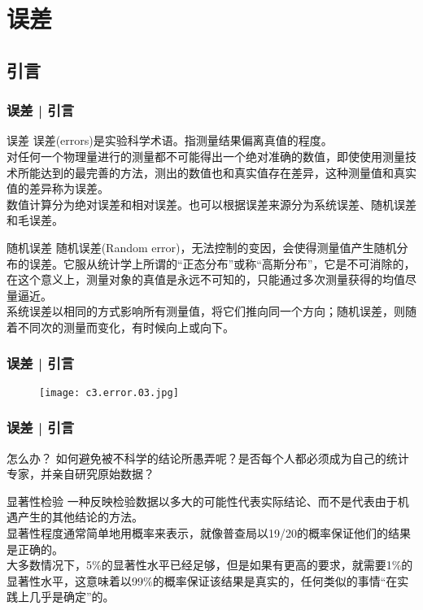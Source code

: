 \section{误差}
\subsection{引言}
\begin{frame}
  \frametitle{误差 | 引言}
  \begin{block}{误差}
    误差(errors)是实验科学术语。指测量结果偏离真值的程度。\\
    \vspace{0.3em}
对任何一个物理量进行的测量都不可能得出一个绝对准确的数值，即使使用测量技术所能达到的最完善的方法，测出的数值也和真实值存在差异，这种测量值和真实值的差异称为误差。\\
\vspace{0.3em}
数值计算分为绝对误差和相对误差。也可以根据误差来源分为系统误差、随机误差和毛误差。
  \end{block}
  \pause
  \begin{block}{随机误差}
    随机误差(Random error)，无法控制的变因，会使得测量值产生随机分布的误差。它服从统计学上所谓的“正态分布”或称“高斯分布”，它是不可消除的，在这个意义上，测量对象的真值是永远不可知的，只能通过多次测量获得的均值尽量逼近。\\
    \vspace{0.3em}
    系统误差以相同的方式影响所有测量值，将它们推向同一个方向；随机误差，则随着不同次的测量而变化，有时候向上或向下。
  \end{block}
\end{frame}

\begin{frame}
  \frametitle{误差 | 引言}
  \begin{figure}
    \centering
    \texttt{[image: c3.error.03.jpg]}
  \end{figure}
\end{frame}

\begin{frame}
  \frametitle{误差 | 引言}
  \begin{block}{怎么办？}
    如何避免被不科学的结论所愚弄呢？是否每个人都必须成为自己的统计专家，并亲自研究原始数据？
  \end{block}
  \pause
  \begin{block}{显著性检验}
    一种反映检验数据以多大的可能性代表实际结论、而不是代表由于机遇产生的其他结论的方法。\\
    \vspace{0.3em}
    显著性程度通常简单地用概率来表示，就像普查局以19/20的概率保证他们的结果是正确的。\\
    \vspace{0.3em}
大多数情况下，5\%的显著性水平已经足够，但是如果有更高的要求，就需要1\%的显著性水平，这意味着以99\%的概率保证该结果是真实的，任何类似的事情“在实践上几乎是确定”的。
  \end{block}
\end{frame}

